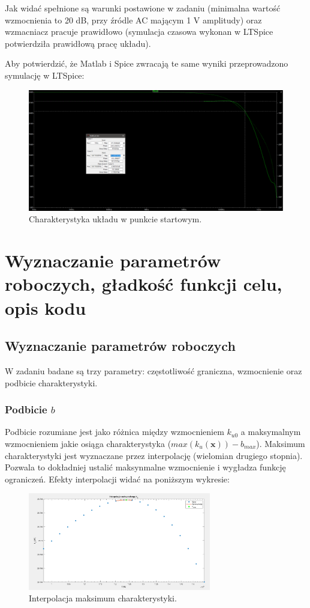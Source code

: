 \documentclass{article}
\begin{document}
Jak widać spełnione są warunki postawione w zadaniu (minimalna wartość wzmocnienia to 20 dB, przy źródle AC mającym 1 V amplitudy) oraz wzmacniacz pracuje prawidłowo (symulacja czasowa wykonan w LTSpice potwierdziła prawidłową pracę układu).
\pagebreak

Aby potwierdzić, że Matlab i Spice zwracają te same wyniki przeprowadzono symulację w LTSpice:
\begin{figure}[h]
	\includegraphics[width=12cm]{graphics/starting_point_spice.png}
	\centering
	\caption{Charakterystyka układu w punkcie startowym.}
\end{figure}




\section{Wyznaczanie parametrów roboczych, gładkość funkcji celu, opis kodu}
\subsection{Wyznaczanie parametrów roboczych}
W zadaniu badane są trzy parametry: częstotliwość graniczna, wzmocnienie oraz podbicie charakterystyki.

\subsubsection*{Podbicie $b$}
Podbicie rozumiane jest jako różnica między wzmocnieniem $k_{u0}$ a maksymalnym wzmocnieniem jakie osiąga charakterystyka ($max(k_{u}(\textbf{x}))-b_{max}$).
Maksimum charakterystyki jest wyznaczane przez interpolację (wielomian drugiego stopnia). Pozwala to dokładniej ustalić maksynmalne wzmocnienie i wygładza funkcję ograniczeń.
Efekty interpolacji widać na poniższym wykresie:
\begin{figure}[h]
	\includegraphics[width=8cm]{graphics/max_ku_interp.png}
	\centering
	\caption{Interpolacja maksimum charakterystyki.}
\end{figure}
\pagebreak
\end{document}
